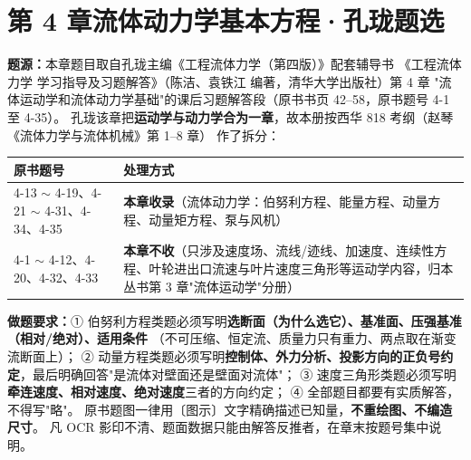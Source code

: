\chapter*{第 4 章\quad 流体动力学基本方程·孔珑题选}

\begin{tishi}
\textbf{题源：}本章题目取自孔珑主编《工程流体力学（第四版）》配套辅导书
《工程流体力学 学习指导及习题解答》（陈洁、袁铁江 编著，清华大学出版社）第 4 章
"流体运动学和流体动力学基础"的课后习题解答段（原书书页 42--58，原书题号 4-1 至 4-35）。
孔珑该章把\textbf{运动学与动力学合为一章}，故本册按西华 818 考纲（赵琴《流体力学与流体机械》第 1--8 章）
作了拆分：

\begin{tabularx}{\linewidth}{@{}lX@{}}
\toprule
原书题号 & 处理方式 \\
\midrule
4-13 $\sim$ 4-19、4-21 $\sim$ 4-31、4-34、4-35 & \textbf{本章收录}（流体动力学：伯努利方程、能量方程、动量方程、动量矩方程、泵与风机） \\
4-1 $\sim$ 4-12、4-20、4-32、4-33 & \textbf{本章不收}（只涉及速度场、流线/迹线、加速度、连续性方程、叶轮进出口流速与叶片速度三角形等运动学内容，归本丛书第 3 章"流体运动学"分册） \\
\bottomrule
\end{tabularx}

\textbf{做题要求：}① 伯努利方程类题必须写明\textbf{选断面（为什么选它）、基准面、压强基准（相对/绝对）、适用条件}
（不可压缩、恒定流、质量力只有重力、两点取在渐变流断面上）；
② 动量方程类题必须写明\textbf{控制体、外力分析、投影方向的正负号约定}，最后明确回答"是流体对壁面还是壁面对流体"；
③ 速度三角形类题必须写明\textbf{牵连速度、相对速度、绝对速度}三者的方向约定；
④ 全部题目都要有实质解答，不得写"略"。
原书题图一律用〔图示〕文字精确描述已知量，\textbf{不重绘图、不编造尺寸}。
凡 OCR 影印不清、题面数据只能由解答反推者，在章末按题号集中说明。
\end{tishi}


